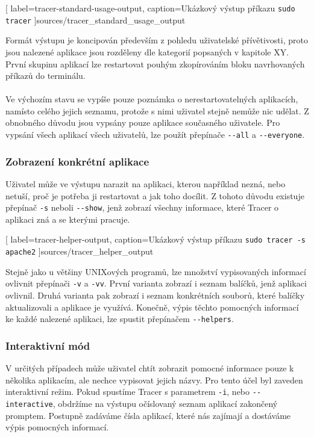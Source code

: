 \documentclass[
  field=inf,
  biblatex,
  glossaries,
  index
]{kidiplom}
\begin{document}
		
		[
			label=tracer-standard-usage-output,
			caption={Ukázkový výstup příkazu \texttt{sudo tracer}}
		]{sources/tracer_standard_usage_output}

		Formát výstupu je koncipován především z pohledu uživatelské přívětivosti, proto jsou nalezené aplikace jsou rozděleny dle kategorií popsaných v kapitole XY. První skupinu aplikací lze restartovat pouhým zkopírováním bloku navrhovaných příkazů do terminálu.
		\\
		\\
		Ve výchozím stavu se vypíše pouze poznámka o nerestartovatelných aplikacích, namísto celého jejich seznamu, protože s nimi uživatel stejně nemůže nic udělat. Z obnobného důvodu jsou vypsány pouze aplikace současného uživatele. Pro vypsání všech aplikací všech uživatelů, lze použít přepínače \texttt{-{}-all} a \texttt{-{}-everyone}.

		\pagebreak
		\subsubsection{Zobrazení konkrétní aplikace}
		Uživatel může ve výstupu narazit na aplikaci, kterou například nezná, nebo netuší, proč je potřeba ji restartovat a jak toho docílit. Z tohoto důvodu existuje přepínač \texttt{-s} neboli \texttt{-{}-show}, jenž zobrazí všechny informace, které Tracer o aplikaci zná a se kterými pracuje.

		
		[
			label=tracer-helper-output,
			caption={Ukázkový výstup příkazu \texttt{sudo tracer -s apache2}}
		]{sources/tracer_helper_output}

		Stejně jako u většiny UNIXových programů, lze množství vypisovaných informací ovlivnit přepínači \texttt{-v} a \texttt{-vv}. První varianta zobrazí i seznam balíčků, jenž aplikaci ovlivnil. Druhá varianta pak zobrazí i seznam konkrétních souborů, které balíčky aktualizovali a aplikace je využívá. Konečně, výpis těchto pomocných informací ke každé nalezené aplikaci, lze spustit přepínačem \texttt{-{}-helpers}.

		\subsubsection{Interaktivní mód}
		V určitých případech může uživatel chtít zobrazit pomocné informace pouze k několika aplikacím, ale nechce vypisovat jejich názvy. Pro tento účel byl zaveden interaktivní režim. Pokud spustíme Tracer s parametrem \texttt{-i}, nebo \texttt{-{}-interactive}, obdržíme na výstupu očíslovaný seznam aplikací zakončený promptem. Postupně zadáváme čísla aplikací, které nás zajímají a dostáváme výpis pomocných informací.
\end{document}
